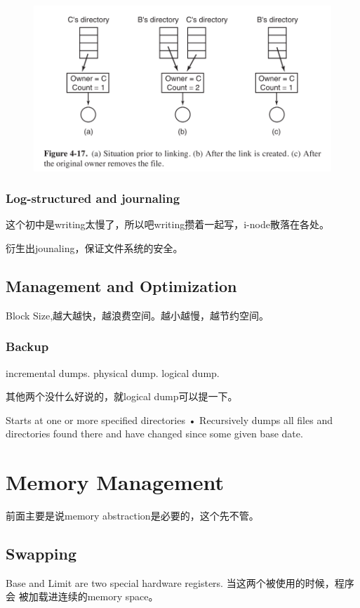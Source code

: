 \documentclass[a4paper]{article}
\begin{document}
\begin{figure}
  \centering
  \includegraphics{staticlink.png}
  \caption{}
  \label{staticlink}
\end{figure}

\subsubsection {Log-structured and journaling}
这个初中是writing太慢了，所以吧writing攒着一起写，i-node散落在各处。

衍生出jounaling，保证文件系统的安全。

\subsection{Management and Optimization}
Block Size,越大越快，越浪费空间。越小越慢，越节约空间。

\subsubsection{Backup}
incremental dumps. physical dump. logical dump.

其他两个没什么好说的，就logical dump可以提一下。

\begin{qutoe}
  Starts at one or more specified
directories
• Recursively dumps all files and
directories found there and have
changed since some given base date.
\end{qutoe}

\section{Memory Management}
前面主要是说memory abstraction是必要的，这个先不管。

\subsection{Swapping}
Base and Limit are two special hardware registers. 当这两个被使用的时候，程序会
被加载进连续的memory space。
\end{document}
